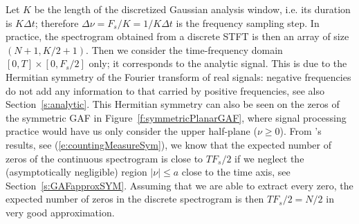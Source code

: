 Let $K$ be
the length of the discretized Gaussian analysis window, i.e. its duration is
$K\Delta t$; therefore $\Delta \nu = F_s/K=1/K\Delta t$ is the frequency
sampling step. In practice, the spectrogram obtained from a discrete STFT is
then an array of size $(N+1, K/2+1)$. Then we consider the time-frequency domain
$[0,T]\times[0,F_s/2]$ only; it corresponds to the analytic signal. This is due
to the Hermitian symmetry of the Fourier transform of real signals: negative
frequencies do not add any information to that carried by positive frequencies,
see also Section~\ref{s:analytic}. This Hermitian symmetry can also be seen on
the zeros of the symmetric GAF in Figure~\ref{f:symmetricPlanarGAF}, where
signal processing practice would have us only consider the upper half-plane ($\nu\geq 0$).
 From \cite{Fel13}'s results, see (\ref{e:countingMeasureSym}), we know that the expected number of zeros of the continuous spectrogram is close to $TF_s/2$ if we neglect the (asymptotically negligible) region $|\nu|\leq a$ close to the time axis, see Section~\ref{s:GAFapproxSYM}. Assuming that we are able to extract every zero, the expected number of zeros in the discrete spectrogram is then $TF_s/2=N/2$ in very good approximation.

